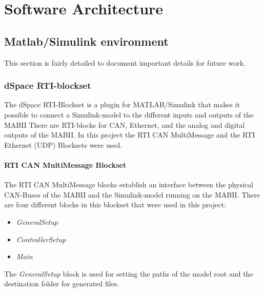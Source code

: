 \documentclass[ExampleMasters.tex]{subfiles}
\begin{document}
\clearpage
{\pagestyle{empty}\cleardoublepage}%


\chapter{Software Architecture}
\label{chap:software_setup}


\section{Matlab/Simulink environment}
\label{sec:matlab}
This section is fairly detailed to document important details for future work.

\subsection{dSpace RTI-blockset}

The dSpace \gls{RTI}-Blockset is a plugin for MATLAB/Simulink that makes it possible to connect a Simulink-model to the different inputs and outputs of the \gls{MABII} There are \gls{RTI}-blocks for \gls{CAN}, Ethernet, and the analog and digital outputs of the \gls{MABII}.
In this project the \gls{RTI} \gls{CAN} MultiMessage and the \gls{RTI} Ethernet (UDP) Blocksets were used.\\ 
\subsubsection{RTI \gls{CAN} MultiMessage Blockset}
The \gls{RTI} \gls{CAN} MultiMessage blocks establish an interface between the physical \gls{CAN}-Buses of the \gls{MABII} and the Simulink-model running on the \gls{MABII}. There are four different blocks in this blockset that were used in this project:
\begin{itemize}
\item \textit{GeneralSetup}
\item \textit{ControllerSetup}
\item \textit{Main}
\end{itemize}
The \textit{GeneralSetup} block is used for setting the paths of the model root and the destination folder for generated files. 
\end{document}

